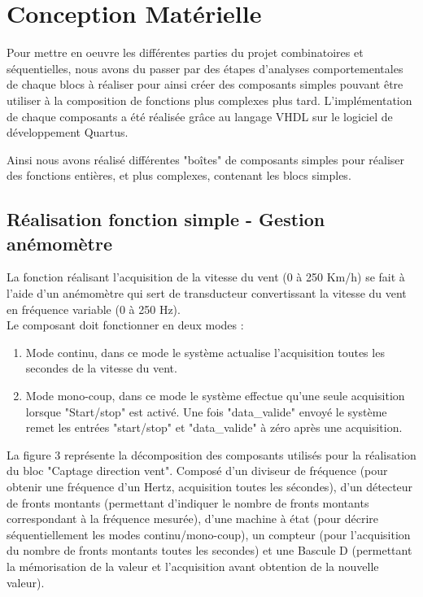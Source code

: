 \section{Conception Matérielle}
Pour mettre en oeuvre les différentes parties du projet combinatoires et séquentielles, nous avons du passer par des étapes d'analyses comportementales de chaque blocs à réaliser pour ainsi créer des composants simples pouvant être utiliser à la composition de fonctions plus complexes plus tard. L'implémentation de chaque composants a été réalisée grâce au langage VHDL sur le logiciel de développement Quartus.

Ainsi nous avons réalisé différentes "boîtes" de composants simples pour réaliser des fonctions entières, et plus complexes, contenant les blocs simples.

\subsection{Réalisation fonction simple - Gestion anémomètre}
La fonction réalisant l'acquisition de la vitesse du vent (0 à 250 Km/h) se fait à l'aide d'un anémomètre qui sert de transducteur convertissant la vitesse du vent en fréquence variable (0 à 250 Hz). 
\vspace{0.5cm}\\
Le composant doit fonctionner en deux modes :
\begin{enumerate}
    \item Mode continu, dans ce mode le système actualise l'acquisition toutes les secondes de la vitesse du vent.  
    \item Mode mono-coup, dans ce mode le système effectue qu'une seule acquisition lorsque "Start/stop" est activé. Une fois "data\_valide" envoyé le système remet les entrées "start/stop" et "data\_valide" à zéro après une acquisition.
\end{enumerate}
\vspace{0.5cm}
La figure 3 représente la décomposition des composants utilisés pour la réalisation du bloc "Captage direction vent". Composé d'un diviseur de fréquence (pour obtenir une fréquence d'un Hertz, acquisition toutes les sécondes), d'un détecteur de fronts montants (permettant d'indiquer le nombre de fronts montants correspondant à la fréquence mesurée), d'une machine à état (pour décrire séquentiellement les modes continu/mono-coup), un compteur (pour l'acquisition du nombre de fronts montants toutes les secondes) et une Bascule D (permettant la mémorisation de la valeur et l'acquisition avant obtention de la nouvelle valeur).

